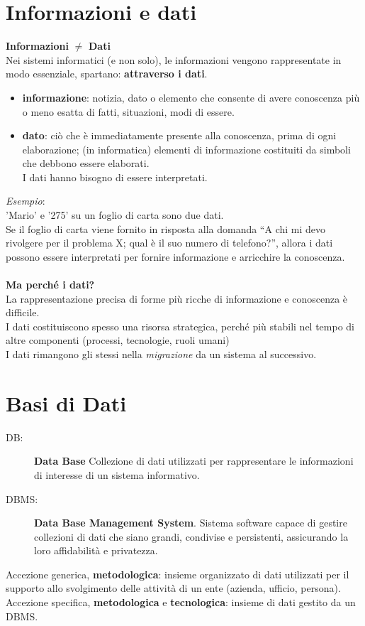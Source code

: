 \section{Informazioni e dati}
\textbf{Informazioni} $\neq$ \textbf{Dati}
\\Nei sistemi informatici (e non solo), le informazioni vengono rappresentate in modo essenziale, spartano: \textbf{attraverso i dati}.
\begin{itemize}
    \item \textbf{informazione}: notizia, dato o elemento che consente di avere conoscenza più o meno esatta di fatti, situazioni, modi di essere.
    \item \textbf{dato}: ciò che è immediatamente presente alla conoscenza, prima di ogni elaborazione; (in informatica) elementi di informazione costituiti da simboli che debbono essere elaborati. 
    \\I dati hanno bisogno di essere interpretati.
\end{itemize}
\textit{Esempio}:
\\'Mario' e '275' su un foglio di carta sono due dati. 
\\Se il foglio di carta viene fornito in risposta alla domanda “A chi mi devo rivolgere per il problema X; qual è il suo numero di telefono?”, allora i dati possono essere interpretati per fornire informazione e arricchire la conoscenza.
\\
\\\textbf{Ma perché i dati?}
\\La rappresentazione precisa di forme più ricche di informazione e conoscenza è difficile.
\\I dati costituiscono spesso una risorsa strategica, perché più stabili nel tempo di altre componenti (processi, tecnologie, ruoli umani)
\\I dati rimangono gli stessi nella \textit{migrazione} da un sistema al successivo.

\section{Basi di Dati}
\begin{description}
    \item[DB:] \textbf{Data Base} Collezione di dati utilizzati per rappresentare le informazioni di interesse di un sistema informativo.
    \item[DBMS:] \textbf{Data Base Management System}. Sistema software capace di gestire collezioni di dati che siano grandi, condivise e persistenti, assicurando la loro affidabilità e privatezza.
\end{description}
Accezione generica, \textbf{metodologica}: insieme organizzato di dati utilizzati per il supporto allo svolgimento delle attività di un ente (azienda, ufficio, persona).
\\Accezione specifica, \textbf{metodologica} e \textbf{tecnologica}: insieme di dati gestito da un DBMS.

